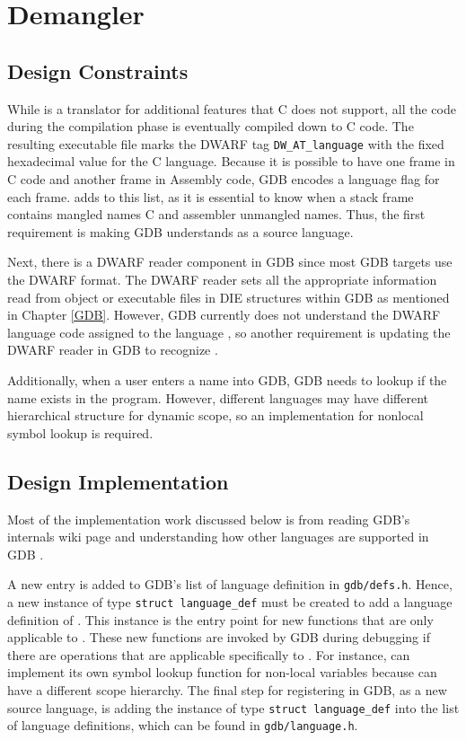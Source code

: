 \chapter{\CFAS Demangler} \label{demangler}

\section{Design Constraints}
While \CFAS is a translator for additional features that C does not support, all
the code during the compilation phase is eventually compiled down to C code.
The resulting executable file marks the DWARF tag \verb|DW_AT_language| with the
fixed hexadecimal value for the C language. Because it is possible to have one frame in C code and another
frame in Assembly code, GDB encodes a language flag for each frame. \CFAS adds
to this list, as it is essential to know when a stack frame contains mangled
names C and assembler unmangled names. Thus, the first requirement is
making GDB understands \CFAS as a source language.

Next, there is a DWARF reader component in GDB since most GDB targets use the DWARF
format. The DWARF reader sets all the appropriate information read from object or
executable files in DIE structures within GDB as mentioned in Chapter
\ref{GDB}. However, GDB currently does not understand the DWARF language code
assigned to the
language \CFA, so another requirement is updating the DWARF reader in GDB to
recognize \CFA.

Additionally, when a user enters a name into GDB, GDB needs to lookup if the
name exists in the program. However, different languages may have different
hierarchical structure for dynamic scope, so an implementation for nonlocal
symbol lookup is required.

\section{Design Implementation}
Most of the implementation work discussed below is from reading GDB's internals
wiki page and understanding how other languages are supported in GDB \cite{reference5}.

A new entry is added to GDB's list of language definition in
\verb|gdb/defs.h|. Hence, a new instance of type \verb|struct language_def|
must be created to add a language definition of \CFAS. This instance is the
entry point for new functions that are only applicable to \CFA. These new
functions are invoked by GDB during debugging if there are operations that
are applicable specifically to \CFA. For instance, \CFAS can implement its
own symbol lookup function for non-local variables because \CFAS can have a
different scope hierarchy. The final step for registering \CFAS in GDB, as a new
source language, is adding the instance of type \verb|struct language_def| into
the list of language definitions, which can be found in
\verb|gdb/language.h|.

